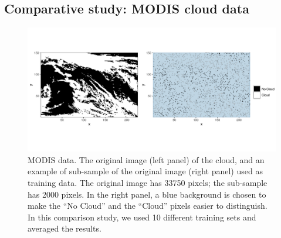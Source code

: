 \subsection{Comparative study: MODIS cloud data}\label{sec:04-01:MODIS}


\begin{figure}[t!]
    \centering
    \includegraphics[width = \linewidth]{Images/MODIS_data.pdf}
     \caption[MODIS dataset: original image, and the subsample]{MODIS data. The original image (left panel) of the cloud, and an example of sub-sample of the original image (right panel) used as training data. The original image has 33750 pixels; the sub-sample has 2000 pixels. In the right panel, a blue background is chosen to make the ``No Cloud'' and the ``Cloud'' pixels easier to distinguish. 
     In this comparison study, we used 10 different training sets and averaged the results.}\label{fig:03-04-Modis1}
\end{figure}


